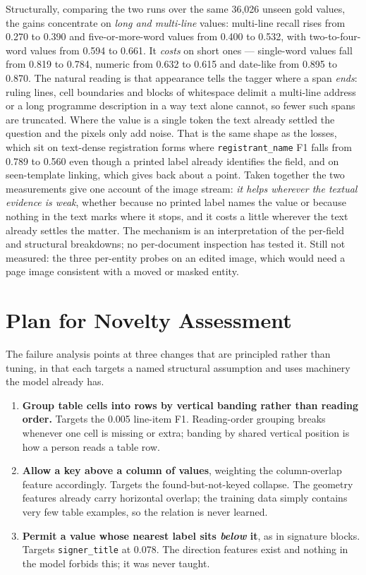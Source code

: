 \documentclass[11pt,a4paper]{article}
\newcommand{\code}[1]{\texttt{\small #1}}
\begin{document}
Structurally, comparing the two runs over the same 36{,}026 unseen gold values, the gains
concentrate on \emph{long and multi-line} values: multi-line recall rises from 0.270 to 0.390 and
five-or-more-word values from 0.400 to 0.532, with two-to-four-word values from 0.594 to 0.661. It
\emph{costs} on short ones --- single-word values fall from 0.819 to 0.784, numeric from 0.632 to
0.615 and date-like from 0.895 to 0.870. The natural reading is that appearance tells the tagger
where a span \emph{ends}: ruling lines, cell boundaries and blocks of whitespace delimit a
multi-line address or a long programme description in a way text alone cannot, so fewer such spans
are truncated. Where the value is a single token the text already settled the question and the
pixels only add noise. That is the same shape as the losses, which sit on text-dense registration
forms where \code{registrant\_name} F1 falls from 0.789 to 0.560 even though a printed label
already identifies the field, and on seen-template linking, which gives back about a point. Taken
together the two measurements give one account of the image stream: \emph{it helps wherever the
textual evidence is weak}, whether because no printed label names the value or because nothing in
the text marks where it stops, and it costs a little wherever the text already settles the matter.
The mechanism is an interpretation of the per-field and structural breakdowns; no per-document
inspection has tested it. Still not measured: the three per-entity probes on an edited image,
which would need a page image consistent with a moved or masked entity.

\section{Plan for Novelty Assessment}
\label{sec:novelty}

The failure analysis points at three changes that are principled rather than tuning, in that each
targets a named structural assumption and uses machinery the model already has.

\begin{enumerate}[leftmargin=1.5em,itemsep=2pt]
  \item \textbf{Group table cells into rows by vertical banding rather than reading order.}
        Targets the 0.005 line-item F1. Reading-order grouping breaks whenever one cell is missing
        or extra; banding by shared vertical position is how a person reads a table row.
  \item \textbf{Allow a key above a column of values}, weighting the column-overlap feature
        accordingly. Targets the found-but-not-keyed collapse. The geometry features already carry
        horizontal overlap; the training data simply contains very few table examples, so the
        relation is never learned.
  \item \textbf{Permit a value whose nearest label sits \emph{below} it}, as in signature blocks.
        Targets \code{signer\_title} at 0.078. The direction features exist and nothing in the
        model forbids this; it was never taught.
\end{enumerate}
\end{document}
